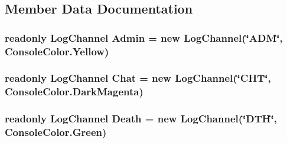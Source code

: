 \subsection{Member Data Documentation}
\hypertarget{classOTA_1_1Logging_1_1ProgramLog_a2804b7f6df68fe4b58e35a417b414405}{}
\subsubsection[{Admin}]{\setlength{\rightskip}{0pt plus 5cm}readonly {\bf Log\+Channel} Admin = new {\bf Log\+Channel}(\char`\"{}A\+D\+M\char`\"{}, Console\+Color.\+Yellow)\hspace{0.3cm}{\ttfamily [static]}}\label{classOTA_1_1Logging_1_1ProgramLog_a2804b7f6df68fe4b58e35a417b414405}
\hypertarget{classOTA_1_1Logging_1_1ProgramLog_a2865ab616e09f54fcec31fd58c8f1c82}{}
\subsubsection[{Chat}]{\setlength{\rightskip}{0pt plus 5cm}readonly {\bf Log\+Channel} Chat = new {\bf Log\+Channel}(\char`\"{}C\+H\+T\char`\"{}, Console\+Color.\+Dark\+Magenta)\hspace{0.3cm}{\ttfamily [static]}}\label{classOTA_1_1Logging_1_1ProgramLog_a2865ab616e09f54fcec31fd58c8f1c82}
\hypertarget{classOTA_1_1Logging_1_1ProgramLog_a73c297cf7c9d249ad2f648bbeb80755c}{}
\subsubsection[{Death}]{\setlength{\rightskip}{0pt plus 5cm}readonly {\bf Log\+Channel} Death = new {\bf Log\+Channel}(\char`\"{}D\+T\+H\char`\"{}, Console\+Color.\+Green)\hspace{0.3cm}{\ttfamily [static]}}\label{classOTA_1_1Logging_1_1ProgramLog_a73c297cf7c9d249ad2f648bbeb80755c}
\hypertarget{classOTA_1_1Logging_1_1ProgramLog_a6fe805373eb7bc274e12ee6e1ecbd037}{}

